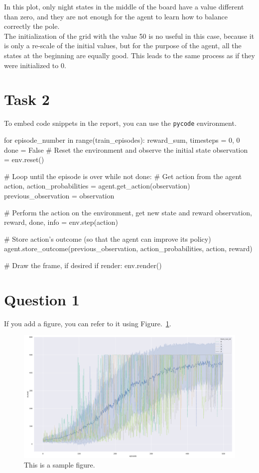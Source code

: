 \documentclass[12pt]{article}
\begin{document}
In this plot, only night states in the middle of the board have a value different than zero, and they are not enough for the agent to learn how to balance correctly the pole. \\

The initialization of the grid with the value 50 is no useful in this case, because it is only a re-scale of the initial values, but for the purpose of the agent, all the states at the beginning are equally good. This leads to the same process as if they were initialized to 0.

\section{Task 2}
To embed code snippets in the report, you can use the \texttt{pycode} environment.

\begin{pycode}
for episode_number in range(train_episodes):
    reward_sum, timesteps = 0, 0
    done = False
    # Reset the environment and observe the initial state
    observation = env.reset()

    # Loop until the episode is over
    while not done:
        # Get action from the agent
        action, action_probabilities = agent.get_action(observation)
        previous_observation = observation

        # Perform the action on the environment, get new state and reward
        observation, reward, done, info = env.step(action)

        # Store action's outcome (so that the agent can improve its policy)
        agent.store_outcome(previous_observation, action_probabilities, action, reward)

        # Draw the frame, if desired
        if render:
            env.render()
\end{pycode}

\section{Question 1}

If you add a figure, you can refer to it using Figure.~\ref*{fig:fig1}.

\begin{figure}[h] 
	\centering  %
    \includegraphics[width=0.9\columnwidth]{img/training.pdf}
	\caption{This is a sample figure.}
	\label{fig:fig1}
\end{figure}


\end{document}
